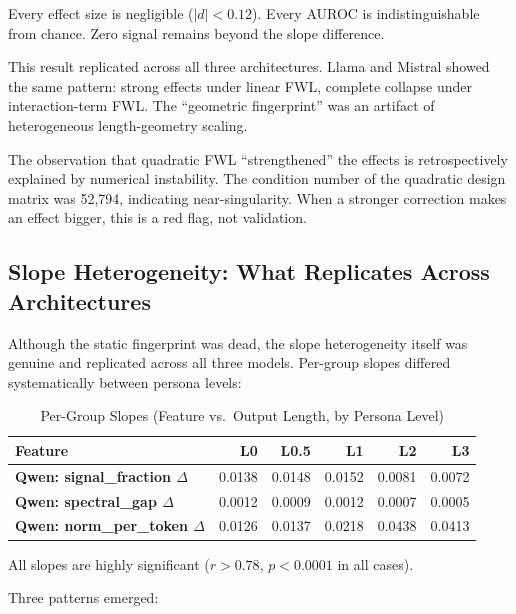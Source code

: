 \documentclass[11pt]{article}
\begin{document}
Every effect size is negligible ($|d| < 0.12$). Every AUROC is indistinguishable from chance. Zero signal remains beyond the slope difference.

This result replicated across all three architectures. Llama and Mistral showed the same pattern: strong effects under linear FWL, complete collapse under interaction-term FWL. The ``geometric fingerprint'' was an artifact of heterogeneous length-geometry scaling.

The observation that quadratic FWL ``strengthened'' the effects is retrospectively explained by numerical instability. The condition number of the quadratic design matrix was 52,794, indicating near-singularity. When a stronger correction makes an effect bigger, this is a red flag, not validation.

\subsection{Slope Heterogeneity: What Replicates Across Architectures}
\label{sec:slope-heterogeneity}

Although the static fingerprint was dead, the slope heterogeneity itself was genuine and replicated across all three models. Per-group slopes differed systematically between persona levels:

\begin{table}[H]
\centering
\caption{Per-Group Slopes (Feature vs.\ Output Length, by Persona Level)}
\label{tab:slopes}
\begin{tabular}{lrrrrr}
\toprule
Feature & L0 & L0.5 & L1 & L2 & L3 \\
\midrule
\textbf{Qwen: signal\_fraction $\Delta$} & 0.0138 & 0.0148 & 0.0152 & 0.0081 & 0.0072 \\
\textbf{Qwen: spectral\_gap $\Delta$} & 0.0012 & 0.0009 & 0.0012 & 0.0007 & 0.0005 \\
\textbf{Qwen: norm\_per\_token $\Delta$} & 0.0126 & 0.0137 & 0.0218 & 0.0438 & 0.0413 \\
\bottomrule
\end{tabular}
\end{table}

All slopes are highly significant ($r > 0.78$, $p < 0.0001$ in all cases).

Three patterns emerged:
\end{document}
